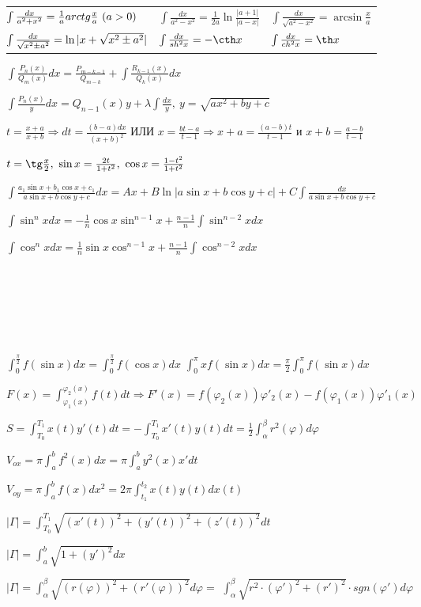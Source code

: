 \documentclass[a4paper, 12pt]{article}
\newcommand\tab[1][.5cm]{\hspace*{#1}}
\theoremstyle{definition}
\begin{document}
    \fontsize{5pt}{5pt}\selectfont
    \begin{tabular}{l l l}
        $\tab[-0.2cm]\int \frac{dx}{a^2 + x^2} = \frac{1}{a}arctg \frac{x}{a}\ (a>0)$ & 
        $\int \frac{dx}{a^2 - x^2} = \frac{1}{2a}\ln \frac{|a + 1|}{|a - x|}$ & 
        $\int \frac{dx}{\sqrt{a^2 - x^2}} = \arcsin \frac{x}{a}$\\
        $\tab[-0.2cm]\int \frac{dx}{\sqrt{x^2 \pm a^2}} = \ln|x + \sqrt{x^2 \pm a^2}|$ & 
        $\int \frac{dx}{sh^2 x} = -\cth x$  &
        $\int \frac{dx}{ch^2 x} = \th x$
    \end{tabular}

    $\int \frac{P_n(x)}{Q_m(x)}dx = \frac{P_{m-k-1}}{Q_{m-k}} + \int \frac{R_{k-1}(x)}{Q_k(x)}dx$

    $\int \frac{P_n(x)}{y}dx = Q_{n-1}(x)y + \lambda\int \frac{dx}{y},\ y = \sqrt{ax^2 + by + c}$

    $t = \frac{x + a}{x + b} \Longrightarrow dt = \frac{(b-a)dx}{(x + b)^2}$ ИЛИ $x = \frac{bt - a}{t - 1} \Longrightarrow x + a = \frac{(a - b)t}{t - 1}$ и $x + b = \frac{a - b}{t - 1} $   
    
    $t = \tg \frac{x}{2},\ \sin x = \frac{2t}{1 + t^2},\ \cos x = \frac{1 - t^2}{1 + t^2}$

    $\int \frac{a_1\sin x + b_1\cos x + c_1}{a\sin x + b\cos y + c}dx = Ax + B\ln|a\sin x + b\cos y + c| + C\int \frac{dx}{a\sin x + b\cos y + c} $

    $\int\sin^nxdx = -\frac{1}{n}\cos x\sin^{n-1} x + 
    \frac{n-1}{n}\int\sin^{n-2}xdx$

    $\int\cos^nxdx = \frac{1}{n}\sin x\cos^{n-1} x + 
    \frac{n-1}{n}\int\cos^{n-2}xdx$ 

    \tab[1cm]\\
    \tab[1cm]\\
    \tab[1cm]\\
    \tab[1cm]\\
    \tab[1cm]\\
    \tab[1cm]

    $\int_{0}^{\frac{\pi}{2}} f(\sin x)dx = \int_{0}^{\frac{\pi}{2}} f(\cos x)dx$\tab[1cm]
    $\int_{0}^{\pi} xf(\sin x)dx = \frac{\pi}{ 2} \int_{0}^{\pi} f(\sin x)dx$

    $F(x) = \int_{\varphi_1(x)}^{\varphi_2(x)} f(t)dt \Longrightarrow F'(x) = f(\varphi_2(x))\varphi'_2(x) - f(\varphi_1(x))\varphi'_1(x)$
    
    $S = \int_{T_0}^{T_1} x(t)y'(t)dt = -\int_{T_0}^{T_1} x'(t)y(t)dt = \frac{1}{2}\int_{\alpha}^{\beta} r^2(\varphi)d \varphi$
    
    $V_{ox} = \pi \int_{a}^{b}f^2(x)dx = \pi \int_{a}^{b} y^2(x)x'dt$ 

    $V_{oy} = \pi \int_{a}^{b} f(x)dx^2 = 2\pi \int_{t_1}^{t_2} x(t)y(t)dx(t)$ 

    $|\Gamma| = \int_{T_0}^{T_1} \sqrt{(x'(t))^2 + (y'(t))^2 + (z'(t))^2}dt$
    
    $|\Gamma| = \int_{a}^{b} \sqrt{1 + (y')^2}dx$
    
    $|\Gamma| = \int_{\alpha}^{\beta} \sqrt{(r(\varphi))^2 + (r'(\varphi))^2}d \varphi =$
    $ \int_{\alpha}^{\beta} \sqrt{r^2\cdot (\varphi')^2 + (r')^2}\cdot sgn(\varphi')d \varphi$ 
    
\end{document}
